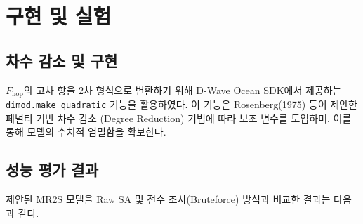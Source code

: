 \documentclass[11pt,a4paper]{article}
\begin{document}
\section{구현 및 실험}

\subsection{차수 감소 및 구현}
$F_{\mathrm{hop}}$의 고차 항을 2차 형식으로 변환하기 위해 D-Wave Ocean SDK에서
제공하는 \texttt{dimod.\allowbreak make\_quadratic} 기능을 활용하였다.
이 기능은 Rosenberg(1975) 등이 제안한 페널티 기반 차수 감소
(Degree Reduction) 기법에 따라 보조 변수를 도입하며, 이를 통해 모델의
수치적 엄밀함을 확보한다.
\cite{glover2018tutorial}

\subsection{성능 평가 결과}
제안된 MR2S 모델을 Raw SA 및 전수 조사(Bruteforce) 방식과 비교한
결과는 다음과 같다.
\end{document}
